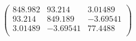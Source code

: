 \documentclass{article}
\begin{document}
\[\left(
\begin{array}{ccc}
 848.982 & 93.214 & 3.01489 \\
 93.214 & 849.189 & -3.69541 \\
 3.01489 & -3.69541 & 77.4488 \\
\end{array}
\right)\]
\end{document}
